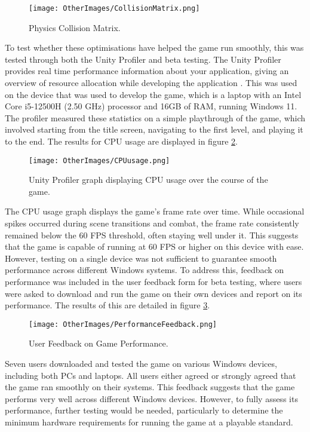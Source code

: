 \documentclass[10pt]{final_report}
\begin{document}
\begin{figure}[H]
    \centering
    \texttt{[image: OtherImages/CollisionMatrix.png]}
    \caption{Physics Collision Matrix.}
    \label{collisionmatrix}
\end{figure}

To test whether these optimisations have helped the game run smoothly, this was tested through both the Unity Profiler and beta testing. The Unity Profiler provides real time performance information about your application, giving an overview of resource allocation while developing the application \cite{UnityProfiler}. This was used on the device that was used to develop the game, which is a laptop with an Intel Core i5-12500H (2.50 GHz) processor and 16GB of RAM, running Windows 11. The profiler measured these statistics on a simple playthrough of the game, which involved starting from the title screen, navigating to the first level, and playing it to the end. The results for CPU usage are displayed in figure \ref{fig:label_CPU}.

\begin{figure}[H]
    \centering
    \texttt{[image: OtherImages/CPUusage.png]}
    \caption{Unity Profiler graph displaying CPU usage over the course of the game.}
    \label{fig:label_CPU}
\end{figure}

The CPU usage graph displays the game's frame rate over time. While occasional spikes occurred during scene transitions and combat, the frame rate consistently remained below the 60 FPS threshold, often staying well under it. This suggests that the game is capable of running at 60 FPS or higher on this device with ease. 
However, testing on a single device was not sufficient to guarantee smooth performance across different Windows systems. To address this, feedback on performance was included in the user feedback form for beta testing, where users were asked to download and run the game on their own devices and report on its performance. The results of this are detailed in figure \ref{performancefeedback}. 

\begin{figure}[H]
    \centering
    \texttt{[image: OtherImages/PerformanceFeedback.png]}
    \caption{User Feedback on Game Performance.}
    \label{performancefeedback}
\end{figure}

Seven users downloaded and tested the game on various Windows devices, including both PCs and laptops. All users either agreed or strongly agreed that the game ran smoothly on their systems. This feedback suggests that the game performs very well across different Windows devices. However, to fully assess its performance, further testing would be needed, particularly to determine the minimum hardware requirements for running the game at a playable standard.
\end{document}
